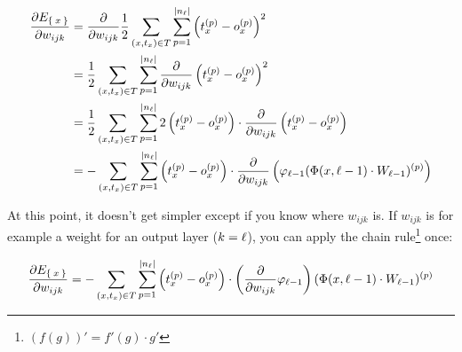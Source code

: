 \begin{align}
    \frac{\partial E_{\Set{x}}}{\partial w_{ijk}}
    &= \frac{\partial}{\partial w_{ijk}} \frac{1}{2} \sum_{(x, t_x) \in T} \sum_{p = 1}^{|n_{\ell}|} \left (t_{x}^{(p)} - o_{x}^{(p)} \right )^2\\
    &= \frac{1}{2} \sum_{(x, t_x) \in T} \sum_{p = 1}^{|n_{\ell}|} \frac{\partial}{\partial w_{ijk}} \left (t_{x}^{(p)} - o_{x}^{(p)} \right )^2\\
    &= \frac{1}{2} \sum_{(x, t_x) \in T} \sum_{p = 1}^{|n_{\ell}|} 2 \left (t_{x}^{(p)} - o_{x}^{(p)} \right ) \cdot \frac{\partial}{\partial w_{ijk}} \left (t_{x}^{(p)} - o_{x}^{(p)} \right )\\
    &= - \sum_{(x, t_x) \in T} \sum_{p = 1}^{|n_{\ell}|} \left (t_{x}^{(p)} - o_{x}^{(p)} \right ) \cdot \frac{\partial}{\partial w_{ijk}} \left (\varphi_{{\ell}-1}(\Phi(x, {\ell}-1) \cdot W_{{\ell}-1})^{(p)} \right)
\end{align}

At this point, it doesn't get simpler except if you know where $w_{ijk}$ is.
If $w_{ijk}$ is for example a weight for an output layer ($k = {\ell}$), you can apply the chain
rule\footnote{$(f(g))' = f'(g) \cdot g'$} once:

\begin{align}
    \frac{\partial E_{\Set{x}}}{\partial w_{ijk}} &= - \sum_{(x, t_x) \in T} \sum_{p = 1}^{|n_{\ell}|} \left (t_{x}^{(p)} - o_{x}^{(p)} \right ) \cdot \left ( \frac{\partial}{\partial w_{ijk}} \varphi_{{\ell}-1} \right )(\Phi(x, {\ell}-1) \cdot W_{{\ell}-1})^{(p)}\\
\end{align}